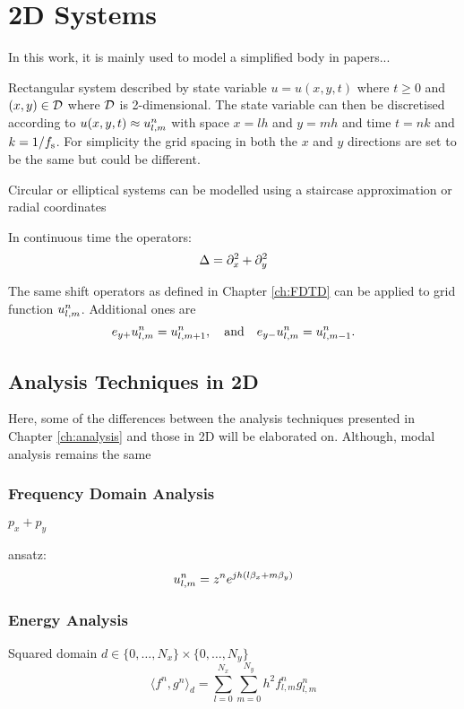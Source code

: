 \chapter{2D Systems}\label{ch:2Dsyst}


In this work, it is mainly used to model a simplified body in papers...


Rectangular system described by state variable $u = u(x,y,t)$  where $t\geq 0$ and $(x,y) \in \mathcal{D}$ where $\mathcal{D}$ is 2-dimensional. The state variable can then be discretised according to $u(x, y, t) \approx u_{l,m}^n$ with space $x = lh$ and $y = mh$ and time $t = nk$ and $k=1/f_\text{s}$. For simplicity the grid spacing in both the $x$ and $y$ directions are set to be the same but could be different.

Circular or elliptical systems can be modelled using a staircase approximation or radial coordinates \cite{theBible}

In continuous time the  operators:
\begin{equation}\label{eq:laplacian}
    \Delta = \partial_x^2 + \partial_y^2
\end{equation}


The same shift operators as defined in Chapter \ref{ch:FDTD} can be applied to grid function $u_{l,m}^n$. Additional ones are
\begin{equation}
    e_{y+}u_{l,m}^n = u_{l, m+1}^n,\quad \text{and}\quad e_{y-}u_{l,m}^n= u_{l, m-1}^n.
\end{equation}

\section{Analysis Techniques in 2D}\label{sec:analysis2D}
Here, some of the differences between the analysis techniques presented in Chapter \ref{ch:analysis} and those in 2D will be elaborated on. Although, modal analysis remains the same

\subsection{Frequency Domain Analysis}
$p_x + p_y$

ansatz:
\begin{equation}
    u_{l,m}^n = z^n e^{jh(l\beta_x + m\beta_y)}
\end{equation}

\subsection{Energy Analysis}
Squared domain 
$d\in \{0, \hdots, N_x\} \times \{0, \hdots, N_y\}$
\begin{equation}\label{eq:2DInnerProd}
    \langle f^n, g^n \rangle_d = \sum_{l = 0}^{N_x}\sum_{m = 0}^{N_y} h^2 f_{l,m}^n g_{l,m}^n
\end{equation}

